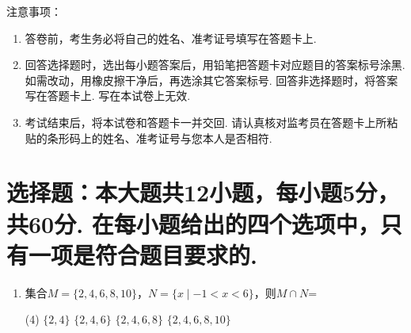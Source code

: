 \documentclass[12pt,space]{ctexart} %
\begin{document}
\juemi%
{\heiti 注意事项}：
\begin{enumerate}[itemsep=-0.3em,topsep=0pt]
\item 答卷前，考生务必将自己的姓名、准考证号填写在答题卡上. 
\item 回答选择题时，选出每小题答案后，用铅笔把答题卡对应题目的答案标号涂黑. 如需改动，用橡皮擦干净后，再选涂其它答案标号. 回答非选择题时，将答案写在答题卡上. 写在本试卷上无效. 
\item 考试结束后，将本试卷和答题卡一并交回. 请认真核对监考员在答题卡上所粘贴的条形码上的姓名、准考证号与您本人是否相符. 
\end{enumerate}

\section{选择题：本大题共12小题，每小题5分，共60分. 在每小题给出的四个选项中，只有一项是符合题目要求的. }
\begin{enumerate}[itemsep=0.2em,topsep=0pt]

  \item 集合$M=\{2,4,6,8,10\}$，$N=\{x \mid-1<x<6\}$，则$M\cap N$= 
  \begin{tasks}(4)
    \task $\{2,4\}$ \task $\{2,4,6\}$ \task $\{2,4,6,8\}$ \task $\{2,4,6,8,10\}$ 
  \end{tasks}

\end{enumerate}

\clearpage
\end{document}
